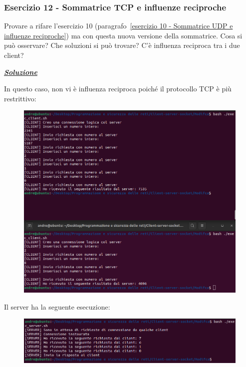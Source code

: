 \documentclass[a4paper]{article}
\begin{document}
	\subsubsection{Esercizio 12 - Sommatrice TCP e influenze reciproche}
	
	Provare a rifare l'esercizio 10 (paragrafo~\ref{esercizio 10 - Sommatrice UDP e influenze reciproche}) ma con questa nuova versione della sommatrice.\newline
	Cosa si può osservare? Che soluzioni si può trovare? C'è influenza reciproca tra i due client?\newline
	
	\noindent
	\textcolor{Green4}{\textbf{\emph{\underline{Soluzione}}}}\newline
	
	\noindent
	In questo caso, non vi è influenza reciproca poiché il protocollo TCP è più restrittivo:
	\begin{figure}[!htp]
		\centering
		\includegraphics[width=\textwidth]{img/soluzioni_TCP-UDP/TCP-UDP_11.png}
	\end{figure}
	
	\noindent
	Il server ha la seguente esecuzione:
	\begin{figure}[!htp]
		\centering
		\includegraphics[width=\textwidth]{img/soluzioni_TCP-UDP/TCP-UDP_10.png}
	\end{figure}\newpage
\end{document}
